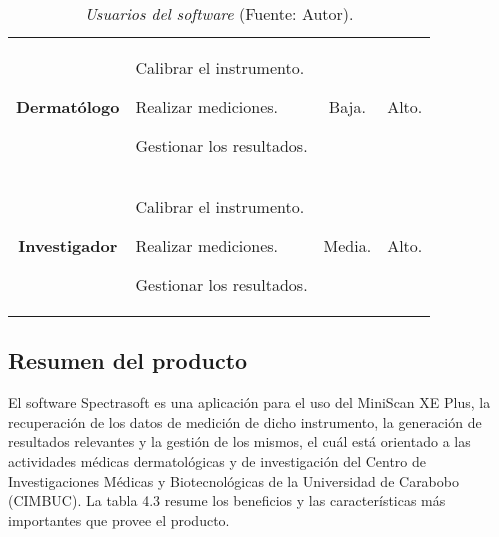 			\begin{table}[h]
		\small
		\caption[Usuarios del software]{\textit{Usuarios del software} (Fuente: Autor).}
		\centering
		\setlength{\extrarowheight}{\altocelda}
		\begin{tabulary}{\anchotabla}{|c|L|c|c|}
			\hline
			 &  &  & \\ \hline
			\textbf{Dermat\'{o}logo} &
			Calibrar el instrumento.
			
			Realizar mediciones.
			
			Gestionar los resultados. &
			Baja. &
			Alto.\\ \hline
			
			\textbf{Investigador} &
			Calibrar el instrumento.
			
			Realizar mediciones.
			
			Gestionar los resultados. &
			Media. &
			Alto.\\ \hline
		\end{tabulary}
	\end{table}
	
	\subsection{Resumen del producto}
	
	El software Spectrasoft es una aplicaci\'{o}n para el uso del MiniScan XE Plus, la recuperaci\'{o}n de los datos de medici\'{o}n de dicho instrumento, la generaci\'{o}n de resultados relevantes y la gesti\'{o}n de los mismos, el cu\'{a}l est\'{a} orientado a las actividades m\'{e}dicas dermatol\'{o}gicas y de investigaci\'{o}n del Centro de Investigaciones M\'{e}dicas y Biotecnol\'{o}gicas de la Universidad de Carabobo (CIMBUC). La tabla 4.3 resume los beneficios y las caracter\'{i}sticas m\'{a}s importantes que provee el producto.
	
